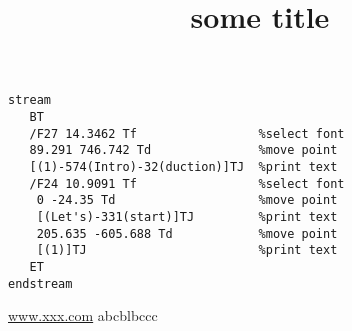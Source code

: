 \documentclass{article}
\title{some title}
\begin{document}
\begin{lstlisting}[columns=fixed]
stream
   BT
   /F27 14.3462 Tf                 %select font
   89.291 746.742 Td               %move point
   [(1)-574(Intro)-32(duction)]TJ  %print text
   /F24 10.9091 Tf                 %select font
    0 -24.35 Td                    %move point
    [(Let's)-331(start)]TJ         %print text
    205.635 -605.688 Td            %move point
    [(1)]TJ                        %print text
   ET
endstream
\end{lstlisting}
\url{www.xxx.com}
abc\newpage blb\newpage ccc
\end{document}

